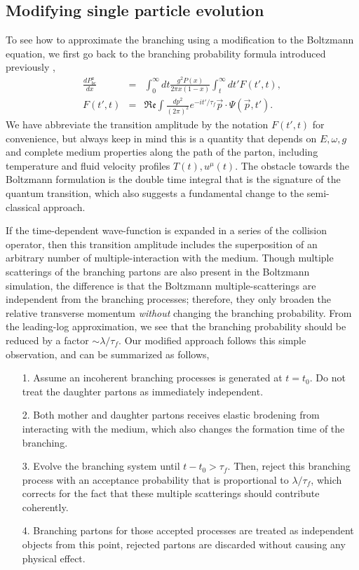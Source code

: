 \subsection{Modifying single particle evolution}
To see how to approximate the branching using a modification to the Boltzmann equation, we first go back to the branching probability formula introduced previously \cite{CaronHuot:2010bp},
\begin{eqnarray}
\frac{dP^{a}_{bc}}{dx} &=& \int_0^\infty dt \frac{g^2 P(x)}{2\pi x (1-x) } \int_t^\infty dt'  F(t', t),
\label{eq:full-theory}
\\
F(t', t) &=& \mathfrak{Re} \int \frac{dp^2}{(2\pi)^2} e^{-it'/\tau_f} \vec{p}\cdot \Psi(\vec{p}, t').
\end{eqnarray}
We have abbreviate the transition amplitude by the notation $F(t', t)$ for convenience, but always keep in mind this is a quantity that depends on $E, \omega, g$ and complete medium properties along the path of the parton, including temperature and fluid velocity profiles $T(t), u^\mu(t)$.
The obstacle towards the Boltzmann formulation is the double time integral that is the signature of the quantum transition, which also suggests a fundamental change to the semi-classical approach.

If the time-dependent wave-function is expanded in a series of the collision operator, then this transition amplitude includes the superposition of an arbitrary number of multiple-interaction with the medium.
Though multiple scatterings of the branching partons are also present in the Boltzmann simulation, the difference is that the Boltzmann multiple-scatterings are independent from the branching processes; therefore, they only broaden the relative transverse momentum {\it without} changing the branching probability.
From the leading-log approximation, we see that the branching probability should be reduced by a factor $\sim \lambda/\tau_f$.
Our modified approach follows this simple observation, and can be summarized as follows,
\begin{itemize}
\item[1.] Assume an incoherent branching processes is generated at $t=t_0$. Do not treat the daughter partons as immediately independent.
\item[2.] Both mother and daughter partons receives elastic brodening from interacting with the medium, which also changes the formation time of the branching.
\item[3.] Evolve the branching system until $t-t_0 > \tau_f$. Then, reject this branching process with an acceptance probability that is proportional to $\lambda/\tau_f$, which corrects for the fact that these multiple scatterings should contribute coherently.
\item[4.] Branching partons for those accepted processes are treated as independent objects from this point, rejected partons are discarded without causing any physical effect.
\end{itemize}

